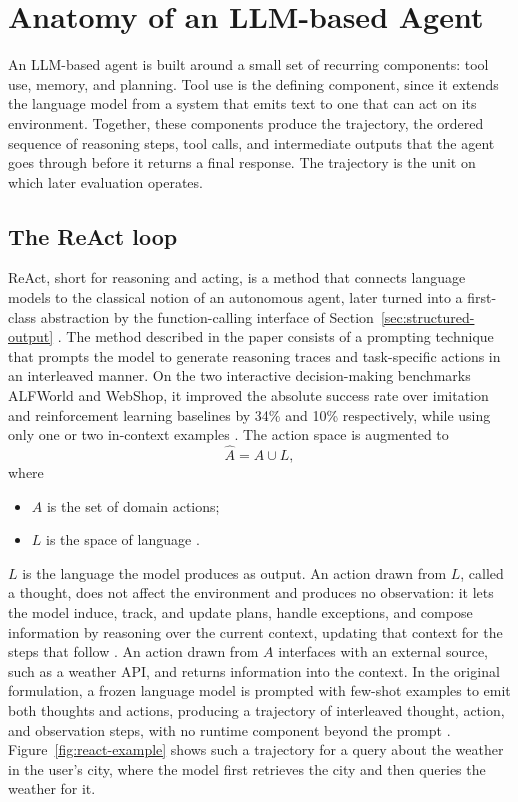 \section{Anatomy of an LLM-based Agent}
\label{sec:agent-anatomy}

An LLM-based agent is built around a small set of recurring components: tool use, memory, and planning. Tool use is the defining component, since it extends the language model from a system that emits text to one that can act on its environment. Together, these components produce the trajectory, the ordered sequence of reasoning steps, tool calls, and intermediate outputs that the agent goes through before it returns a final response. The trajectory is the unit on which later evaluation operates.

\subsection{The ReAct loop}
\label{subsec:tool-use-react}

ReAct, short for reasoning and acting, is a method that connects language models to the classical notion of an autonomous agent, later turned into a first-class abstraction by the function-calling interface of Section~\ref{sec:structured-output} \cite{yaoReActSynergizingReasoning2022, FunctionCallingOther2024}. The method described in the paper consists of a prompting technique that prompts the model to generate reasoning traces and task-specific actions in an interleaved manner. On the two interactive decision-making benchmarks ALFWorld and WebShop, it improved the absolute success rate over imitation and reinforcement learning baselines by 34\% and 10\% respectively, while using only one or two in-context examples \cite{yaoReActSynergizingReasoning2022}. The action space is augmented to
\begin{equation}
    \hat{A} = A \cup L,
\end{equation}
where
\begin{itemize}
    \item $A$ is the set of domain actions;
    \item $L$ is the space of language \cite{yaoReActSynergizingReasoning2022}.
\end{itemize}
$L$ is the language the model produces as output. An action drawn from $L$, called a thought, does not affect the environment and produces no observation: it lets the model induce, track, and update plans, handle exceptions, and compose information by reasoning over the current context, updating that context for the steps that follow \cite{yaoReActSynergizingReasoning2022}. An action drawn from $A$ interfaces with an external source, such as a weather API, and returns information into the context. In the original formulation, a frozen language model is prompted with few-shot examples to emit both thoughts and actions, producing a trajectory of interleaved thought, action, and observation steps, with no runtime component beyond the prompt \cite{yaoReActSynergizingReasoning2022}. Figure~\ref{fig:react-example} shows such a trajectory for a query about the weather in the user's city, where the model first retrieves the city and then queries the weather for it.

